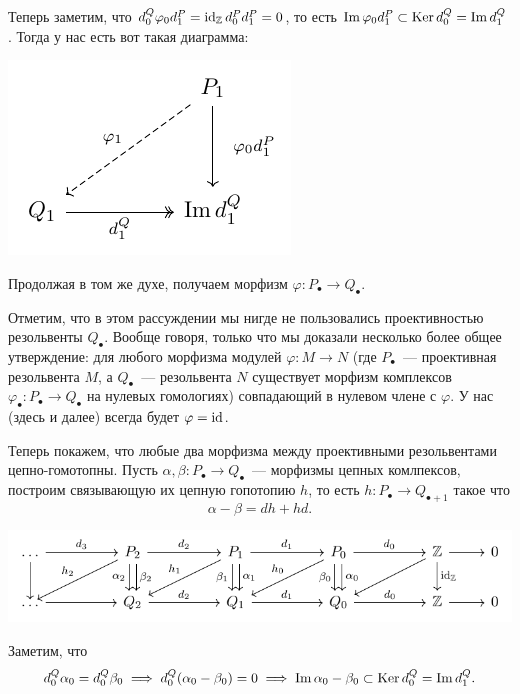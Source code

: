 	Теперь заметим, что $d_0^Q  \varphi_0 d_1^P = \operatorname{id}_{\mathbb{Z}} d_0^P d_1^P = 0$, то есть $\mathop{\mathrm{Im}}\nolimits{\varphi_0 d_1^{P}} \subset \operatorname{Ker}{d_0^Q} = \mathop{\mathrm{Im}}\nolimits{d_1^Q}$. Тогда у нас есть вот такая диаграмма: 

	\begin{center}
		\includegraphics{lectures/6/pictures/cd_2.pdf}
	\end{center}

	Продолжая в том же духе, получаем морфизм $\varphi\colon P_{\bullet} \to Q_{\bullet}$. 

	\begin{remark}
		Отметим, что в этом рассуждении мы нигде не пользовались проективностью резольвенты $Q_{\bullet}$. Вообще говоря, только что мы доказали несколько более общее утверждение: для любого морфизма модулей $\varphi\colon M \to N$ (где $P_{\bullet}$~--- проективная резольвента $M$, а $Q_{\bullet}$~---  резольвента $N$ существует морфизм комплексов $\varphi_{\bullet} \colon P_{\bullet} \to Q_{\bullet}$ на нулевых гомологиях) совпадающий в нулевом члене с $\varphi$. У нас (здесь и далее) всегда будет $\varphi = \operatorname{id}$.  
	\end{remark}

	Теперь покажем, что любые два морфизма между проективными резольвентами цепно-гомотопны. Пусть $\alpha, \beta\colon P_{\bullet} \to Q_{\bullet}$~--- морфизмы цепных комлпексов, построим связывающую их цепную гопотопию $h$, то есть $h\colon P_{\bullet} \to Q_{\bullet + 1}$ такое что 
	\[
		\alpha - \beta = dh + hd.
	\]

	\begin{center}
		\includegraphics{lectures/6/pictures/cd_3.pdf}
	\end{center}

	Заметим, что 
	\[
		d_0^Q \alpha_0 =  d_0^Q \beta_0 \implies d_0^Q(\alpha_0 - \beta_0) = 0 \implies \mathop{\mathrm{Im}}\nolimits{\alpha_0 - \beta_0} \subset \operatorname{Ker}{d_0^Q} = \mathop{\mathrm{Im}}\nolimits{d_1^Q}.
	\]
	

